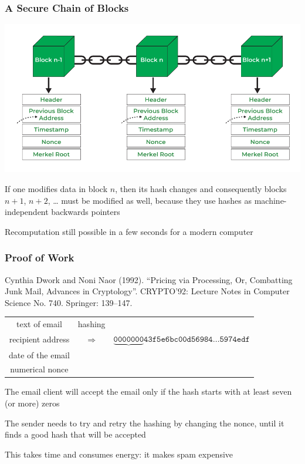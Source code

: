 \documentclass[11pt]{beamer}  %
\begin{document}
\begin{frame}\frametitle{A Secure Chain of Blocks}

  \begin{center}
    \includegraphics[scale=0.26,clip=false]{pictures/blocks.png}
  \end{center}

  If one modifies data in block $n$, then its hash changes and consequently
  blocks $n+1$, $n+2$, \ldots
  must be modified as well, because they use hashes as machine-independent backwards pointers

  \medskip

  \begin{redbox}{}
    Recomputation still possible in a few seconds for a modern computer
  \end{redbox}
  
\end{frame}

\begin{frame}\frametitle{Proof of Work}

  \begin{redbox}{}
    Cynthia Dwork and Noni Naor (1992). “Pricing via Processing, Or, Combatting Junk Mail, Advances in Cryptology”. CRYPTO’92: Lecture Notes in Computer Science No. 740. Springer: 139–147.
  \end{redbox}

  \bigskip

  \begin{tabular}{ccc}
    text of email & hashing & \\
    recipient address & $\Rightarrow$ & $\mathtt{\underbrace{0000000}43f5e6bc00d56984\ldots5974edf}$\\
    date of the email && \\
    numerical nonce &&
  \end{tabular}

  \bigskip

  The email client will accept the email only if the hash starts with at least seven (or more) zeros

  \bigskip

  The sender needs to try and retry the hashing by changing the nonce, until it finds a good hash that will be accepted

  \bigskip

  This takes time and consumes energy: it makes spam expensive

\end{frame}
\end{document}
